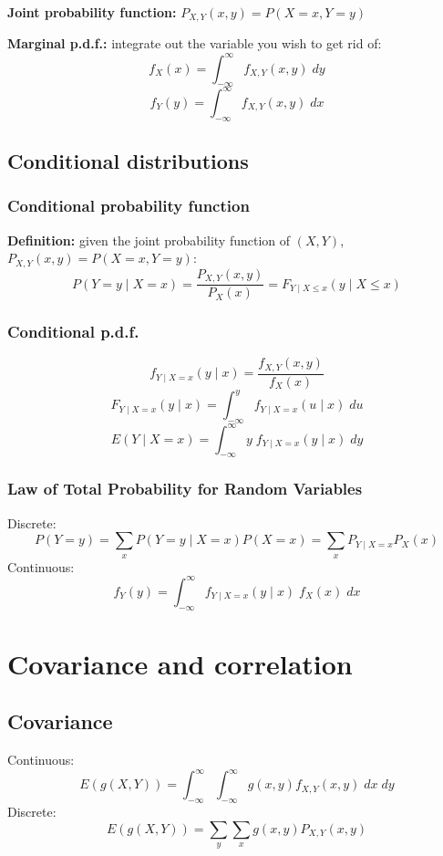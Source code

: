 \documentclass[15pt]{article}
\begin{document}
\textbf{Joint probability function:} $P_{X,Y} (x,y) = P(X=x, Y=y)$

\textbf{Marginal p.d.f.:} integrate out the variable you wish to get rid of:
\[
    f_X (x) = \int_{-\infty}^{\infty} f_{X,Y} (x,y) \; dy
\]
\[
    f_Y (y) = \int_{-\infty}^{\infty} f_{X,Y} (x,y) \; dx
\]

\subsection{Conditional distributions}
\subsubsection{Conditional probability function}
\textbf{Definition:} given the joint probability function of $(X,Y)$, $P_{X,Y} (x,y) = P(X = x, Y = y)$:
\[
    P(Y = y \; | \; X = x) = \frac{P_{X,Y} (x,y)}{P_X (x)} = F_{Y \; | \; X \leq x} (y \; | \; X \leq x)
\]

\subsubsection{Conditional p.d.f.}
\[
    f_{Y \; | \; X = x} (y \; | \; x) = \frac{f_{X,Y} (x,y)}{f_X (x)}
\]
\[
    F_{Y \; | \; X = x} (y \; | \; x) = \int_{-\infty}^y f_{Y \; | \; X =x} (u \; | \; x) \; du
\]
\[
    E(Y \; | \; X = x) = \int_{-\infty}^{\infty} y \; f_{Y \; | \; X =x} (y \; | \; x) \; dy   
\]

\subsubsection{Law of Total Probability for Random Variables}
Discrete:
\[
    P(Y = y) = \sum_{x} P(Y = y \; | \; X = x) P(X = x) = \sum_x P_{Y \; | \; X = x} P_X (x)
\]
Continuous:
\[
    f_Y (y) = \int_{-\infty}^{\infty} f_{Y \; | \; X = x} (y \; | \; x) \; f_X (x) \; dx
\]

\section{Covariance and correlation}
\subsection{Covariance}
Continuous:
\[
    E(g(X,Y)) = \int_{-\infty}^{\infty} \int_{-\infty}^{\infty} g(x,y) f_{X,Y} (x,y) \; dx \; dy
\]
Discrete:
\[
    E(g(X,Y)) = \sum_y \sum_x g(x,y) P_{X,Y} (x,y)
\]
\end{document}
